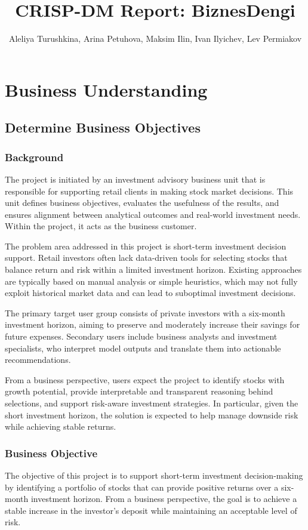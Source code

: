 \documentclass[oneside,final,12pt,a4paper]{extreport}
\title{CRISP-DM Report: BiznesDengi}
\author{Aleliya Turushkina, Arina Petuhova, Maksim Ilin, Ivan Ilyichev, Lev Permiakov}
\begin{document}
\maketitle

\newpage

\section{Business Understanding}
\subsection{Determine Business Objectives}


\subsubsection{Background}
The project is initiated by an investment advisory business unit that is responsible for supporting retail clients in making stock market decisions. This unit defines business objectives, evaluates the usefulness of the results, and ensures alignment between analytical outcomes and real-world investment needs. Within the project, it acts as the business customer.

The problem area addressed in this project is short-term investment decision support. Retail investors often lack data-driven tools for selecting stocks that balance return and risk within a limited investment horizon. Existing approaches are typically based on manual analysis or simple heuristics, which may not fully exploit historical market data and can lead to suboptimal investment decisions.

The primary target user group consists of private investors with a six-month investment horizon, aiming to preserve and moderately increase their savings for future expenses. Secondary users include business analysts and investment specialists, who interpret model outputs and translate them into actionable recommendations.

From a business perspective, users expect the project to identify stocks with growth potential, provide interpretable and transparent reasoning behind selections, and support risk-aware investment strategies. In particular, given the short investment horizon, the solution is expected to help manage downside risk while achieving stable returns.

\subsubsection{Business Objective}
The objective of this project is to support short-term investment decision-making by identifying a portfolio of stocks that can provide positive returns over a six-month investment horizon. From a business perspective, the goal is to achieve a stable increase in the investor’s deposit while maintaining an acceptable level of risk.
\end{document}
